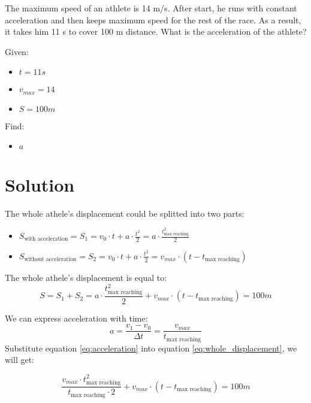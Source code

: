 
The maximum speed of an athlete is 14 m/s. After start, he runs with constant acceleration and
then keeps maximum speed for the rest of the race. As a result, it takes him 11 s to cover 100 m
distance. What is the acceleration of the athlete?

\bigbreak Given:

\begin{itemize}
    \item $t = 11s$
    \item $v_{max} = 14$
    \item $S = 100m$
\end{itemize}

\bigbreak Find:

\begin{itemize}
    \item $a$
\end{itemize}

\section*{Solution}

The whole athele's displacement could be splitted into two parts:

\begin{itemize}
    \item $S_{\text{with acceleration}} = S_1 = v_0 \cdot t + a \cdot \frac{t^2}{2} = a \cdot \frac{t_{\text{max reaching}}^2}{2}$
    \item $ S_{\text{without acceleration}} = S_2 = v_0 \cdot t + a \cdot \frac{t^2}{2} = v_{max} \cdot (t - t_{\text{max reaching}})$
\end{itemize}

The whole athele's displacement is equal to:
\begin{equation}
    \label{eq:whole_displacement}
    S = S_1 + S_2 = a \cdot \frac{t_{\text{max reaching}}^2}{2} + v_{max} \cdot (t - t_{\text{max reaching}}) = 100m
\end{equation}

We can express acceleration with time:
\begin{equation}
    \label{eq:acceleration}
    a = \frac{v_1 - v_0}{\Delta t} = \frac{v_{max}}{t_{\text{max reaching}}}
\end{equation}
Substitute equation \ref{eq:acceleration} into equation \ref{eq:whole_displacement}, we will get:

$$\frac{v_{max} \cdot t_{\text{max reaching}}^2}{t_{\text{max reaching}} \cdot 2} + v_{max} \cdot (t - t_{\text{max reaching}}) = 100m$$

